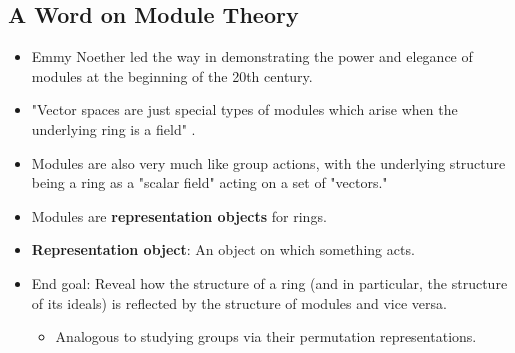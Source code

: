 \documentclass[../notes.tex]{subfiles}
\begin{document}
\subsection*{A Word on Module Theory}
\begin{itemize}
    \item {}Emmy Noether led the way in demonstrating the power and elegance of modules at the beginning of the 20th century.
    \item "Vector spaces are just special types of modules which arise when the underlying ring is a field" \parencite[336]{bib:DummitFoote}.
    \item Modules are also very much like group actions, with the underlying structure being a ring as a "scalar field" acting on a set of "vectors."
    \item Modules are \textbf{representation objects} for rings.
    \item \textbf{Representation object}: An object on which something acts.
    \item End goal: Reveal how the structure of a ring (and in particular, the structure of its ideals) is reflected by the structure of modules and vice versa.
    \begin{itemize}
        \item Analogous to studying groups via their permutation representations.
    \end{itemize}
\end{itemize}
\end{document}
